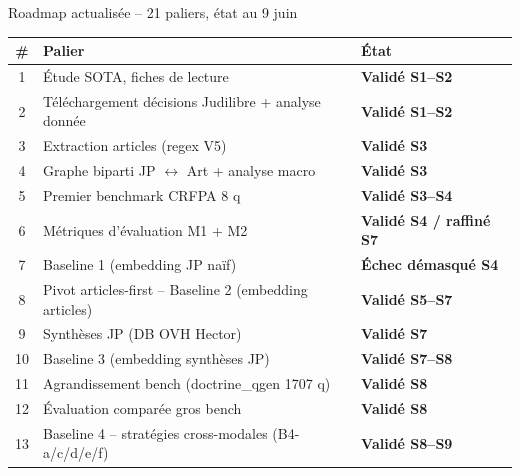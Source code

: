 \documentclass[aspectratio=169,10pt]{beamer}
\begin{document}
\begin{frame}{Roadmap actualisée -- 21 paliers, état au 9 juin}
  \scriptsize
  \renewcommand{\arraystretch}{1.05}
  \begin{center}
  \begin{tabular}{@{}c p{8.8cm} l@{}}
    \toprule
    \textbf{\#} & \textbf{Palier} & \textbf{État} \\
    \midrule
    1  & Étude SOTA, fiches de lecture                                                & \textcolor{ok}{\textbf{Validé S1--S2}} \\
    2  & Téléchargement décisions Judilibre + analyse donnée                         & \textcolor{ok}{\textbf{Validé S1--S2}} \\
    3  & Extraction articles (regex V5)                                              & \textcolor{ok}{\textbf{Validé S3}} \\
    4  & Graphe biparti JP $\leftrightarrow$ Art + analyse macro                     & \textcolor{ok}{\textbf{Validé S3}} \\
    5  & Premier benchmark CRFPA 8 q                                                 & \textcolor{ok}{\textbf{Validé S3--S4}} \\
    6  & Métriques d'évaluation M1 + M2                                              & \textcolor{ok}{\textbf{Validé S4 / raffiné S7}} \\
    7  & Baseline 1 (embedding JP naïf)                                              & \textcolor{warn}{\textbf{Échec démasqué S4}} \\
    \rowcolor{accentsoft}
    8  & Pivot articles-first -- Baseline 2 (embedding articles)                     & \textcolor{ok}{\textbf{Validé S5--S7}} \\
    \rowcolor{accentsoft}
    9  & Synthèses JP (DB OVH Hector)                                                & \textcolor{ok}{\textbf{Validé S7}} \\
    \rowcolor{accentsoft}
    10 & Baseline 3 (embedding synthèses JP)                                         & \textcolor{ok}{\textbf{Validé S7--S8}} \\
    \rowcolor{accentsoft}
    11 & Agrandissement bench (doctrine\_qgen 1707 q)                                & \textcolor{ok}{\textbf{Validé S8}} \\
    \rowcolor{accentsoft}
    12 & Évaluation comparée gros bench                                              & \textcolor{ok}{\textbf{Validé S8}} \\
    \rowcolor{accentsoft}
    13 & Baseline 4 -- stratégies cross-modales (B4-a/c/d/e/f)                       & \textcolor{ok}{\textbf{Validé S8--S9}} \\

\end{tabular}
\end{center}
\end{frame}
\end{document}
